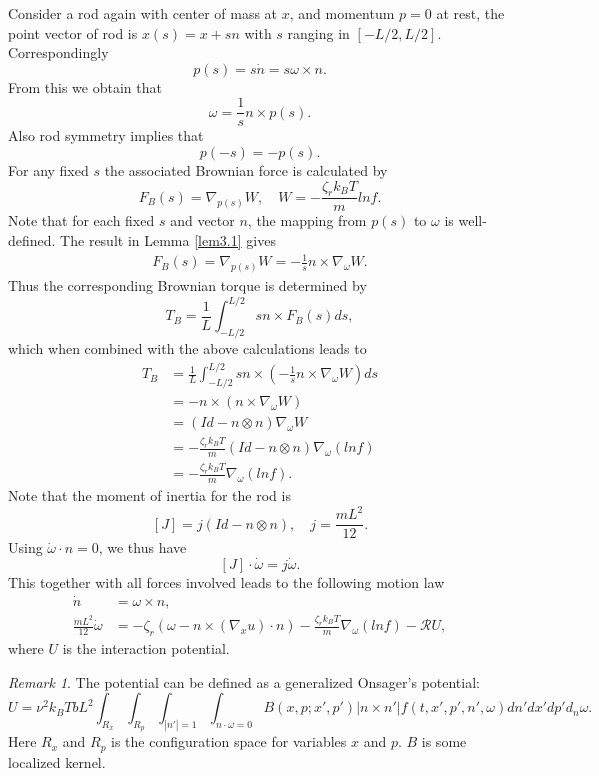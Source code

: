 \documentclass[reqno]{amsart}
\numberwithin{equation}{section}
\theoremstyle{definition}
\theoremstyle{remark}
\newtheorem{Remark}{Remark}[section]
\begin{document}
Consider a rod again with center of mass at $x$, and momentum $p=0$
at rest, the point vector of rod is $x(s)=x+sn$ with $s$ ranging in
$[-L/2, L/2]$. Correspondingly
$$
p(s)= s \dot n=s \omega \times n.
$$
From this we obtain that
\begin{equation}\label{os}
\omega=\frac{1}{s}n \times p(s).
\end{equation}
Also rod symmetry implies that
\begin{equation}\label{ps}
p(-s)=-p(s).
\end{equation}
For any fixed $s$ the associated Brownian force is calculated by
\begin{equation}\label{fb}
F_B(s) = \nabla_{p(s)}W, \quad   W=-\frac{\zeta_r k_B T}{m}ln f .
\end{equation}
Note that for each fixed $s$ and vector $n$, the mapping from $p(s)$
to $\omega$ is well-defined. The result in Lemma \ref{lem3.1} gives
\begin{align*}
F_B(s) = \nabla_{p(s)}W =  -\frac{1}{s} n\times \nabla_\omega W.
\end{align*}
Thus the corresponding Brownian torque is determined by
$$
T_B=\frac{1}{L}\int^{L/2}_{-L/2}s n \times F_B(s) ds,
$$
which when combined with the above calculations leads to
\begin{align*}
T_B&=\frac{1}{L}\int_{-L/2}^{L/2} s n \times \left(
-\frac{1}{s}n\times \nabla_\omega W \right)ds \\
& =-n\times (n\times \nabla_\omega W)\\
&=(Id-n\otimes n)\nabla_\omega W\\
&=-\frac{\zeta_r k_B T}{m}(Id-n\otimes n)\nabla_\omega (ln f)\\
&=-\frac{\zeta_r k_B T}{m}\nabla_\omega (ln f).
\end{align*}
Note that the moment of inertia for the rod is
$$
[J]=j(Id-n\otimes n), \quad j=\frac{mL^2}{12}.
$$
Using $\dot \omega \cdot n=0$, we thus have
$$
[J]\cdot \dot \omega=j \dot \omega.
$$
This together with all forces involved leads to the following motion
law
\begin{align}
\dot n &= \omega \times n, \\
\frac{mL^2}{12}\dot \omega &=-\zeta_r (\omega -n\times (\nabla_x
u)\cdot n)  -\frac{\zeta_r k_B T}{m}\nabla_\omega (ln f)
-\mathcal{R} U,
\end{align}
where $U$ is the interaction potential.
\begin{Remark} The potential can be defined as a generalized Onsager's
potential:
$$
U=\nu^2 k_B TbL^2 \int_{R_x}\int_{R_p}\int_{|n'|=1}\int_{n\cdot
\omega=0}B(x,p;x',p')|n \times n'|f(t, x',p', n',
\omega)dn'dx'dp'd_n\omega.
$$
Here $R_x$ and $R_p$ is the configuration space for variables $x$
and $p$. $B$ is some localized kernel.
\end{Remark}
\end{document}
